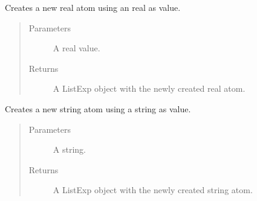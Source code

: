 \documentclass[letterpaper,10pt,english]{sphinxmanual}
\begin{document}
\begin{fulllineitems}
\label{\detokenize{index:secondodb.api.support.secondolistexpr.create_real_atom}}
Creates a new real atom using an real as value.
\begin{quote}\begin{description}
\item[{Parameters}] \leavevmode
{} \textendash{} A real value.

\item[{Returns}] \leavevmode
A ListExp object with the newly created real atom.

\end{description}\end{quote}

\end{fulllineitems}


\begin{fulllineitems}
\label{\detokenize{index:secondodb.api.support.secondolistexpr.create_string_atom}}
Creates a new string atom using a string as value.
\begin{quote}\begin{description}
\item[{Parameters}] \leavevmode
{} \textendash{} A string.

\item[{Returns}] \leavevmode
A ListExp object with the newly created string atom.

\end{description}\end{quote}

\end{fulllineitems}

\end{document}
